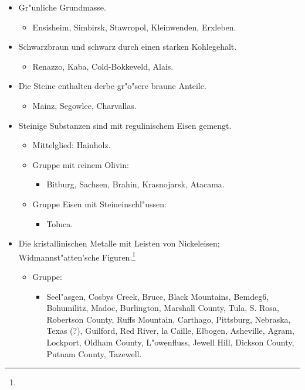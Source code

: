 \documentclass[a4paper, 11pt, oneside]{article}
\begin{document}
\begin{itemize}
\begin{itemize}
    \end{itemize}
    \item[4. Sippe.] Gr"unliche Grundmasse.
    \begin{itemize}
        \item Ensisheim, Simbirsk, Stawropol, Kleinwenden, Erxleben.
    \end{itemize}
    \item[5. Sippe.] Schwarzbraun und schwarz durch einen starken Kohlegehalt.
    \begin{itemize}
        \item Renazzo, Kaba, Cold-Bokkeveld, Alais.
    \end{itemize}
    \item[6. Sippe.] Die Steine enthalten derbe gr"o"sere braune Anteile.
    \begin{itemize}
        \item Mainz, Segowlee, Charvallas.
    \end{itemize}
    \item[7. Sippe.] Steinige Substanzen sind mit regulinischem Eisen gemengt.
    \begin{itemize}
        \item Mittelglied: Hainholz.
        \item[1.] Gruppe mit reinem Olivin:
        \begin{itemize}
            \item Bitburg, Sachsen, Brahin, Krasnojarsk, Atacama.
        \end{itemize}
        \item[2.] Gruppe Eisen mit Steineinschl"ussen:
        \begin{itemize}
            \item Toluca.
        \end{itemize}
    \end{itemize}
    \item[8. Sippe.] Die kristallinischen Metalle mit Leisten von Nickeleisen; Widmannst"atten'sche Figuren.\footnote{}
    \begin{itemize}
        \item[1.] Gruppe:
        \begin{itemize}
            \item Seel"asgen, Cosbys Creek, Bruce, Black Mountains, Bemdeg6, Bohumilitz, Madoc, Burlington, Marshall County, Tula, S. Rosa, Robertson County, Ruffs Mountain, Carthago, Pittsburg, Nebraska, Texas (?), Guilford, Red River, la Caille, Elbogen, Asheville, Agram, Lockport, Oldham County, L"owenfluss, Jewell Hill, Dickson County, Putnam County, Tazewell.

\end{itemize}
\end{itemize}
\end{itemize}
\end{document}
